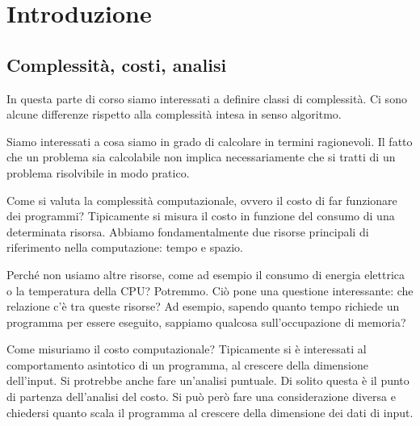 %
%
%
%
\chapter{Introduzione}

\section{Complessità, costi, analisi}

In questa parte di corso siamo interessati a definire classi di complessità. Ci sono alcune
differenze rispetto alla complessità intesa in senso algoritmo.

Siamo interessati a cosa siamo in grado di calcolare in termini ragionevoli. Il fatto che un
problema sia calcolabile non implica necessariamente che si tratti di un problema risolvibile in
modo pratico.

Come si valuta la complessità computazionale, ovvero il costo di far funzionare dei programmi?
Tipicamente si misura il costo in funzione del consumo di una determinata risorsa. Abbiamo
fondamentalmente due risorse principali di riferimento nella computazione: tempo e spazio.

Perché non usiamo altre risorse, come ad esempio il consumo di energia elettrica o la temperatura
della CPU? Potremmo. Ciò pone una questione interessante: che relazione c'è tra queste risorse? Ad
esempio, sapendo quanto tempo richiede un programma per essere eseguito, sappiamo qualcosa
sull'occupazione di memoria?%

Come misuriamo il costo computazionale? Tipicamente si è interessati al comportamento asintotico di
un programma, al crescere della dimensione dell'input. Si protrebbe anche fare un'analisi puntuale.
Di solito questa è il punto di partenza dell'analisi del costo. Si può però fare una considerazione
diversa e chiedersi quanto scala il programma al crescere della dimensione dei dati di input.

